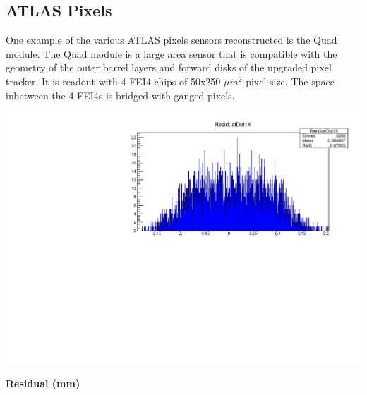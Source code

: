 \documentclass[a0,portrait]{a0poster}
\begin{document}
\begin{multicols}{2}
\section*{ATLAS Pixels}
One example of the various ATLAS pixels sensors reconstructed is the Quad module. The Quad module is a large area sensor that is compatible with the geometry of the outer barrel layers and forward disks of the upgraded pixel tracker. It is readout with 4 FEI4 chips of 50x250 $\mu m^2$ pixel size\cite{quad}. The space inbetween the 4 FEI4s is bridged with ganged pixels. 

\begin{center}
\centering
\includegraphics[width=0.8\linewidth]{figures/QuadXRes21.pdf}
\vspace*{-20 mm}
\begin{center}
\textbf{Residual (mm)} 
\end{center}
\label{trine}
\end{center}





\end{multicols}
\end{document}
